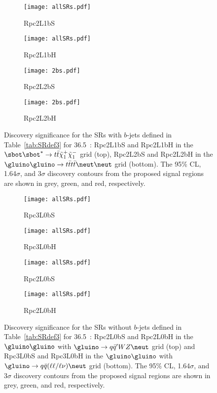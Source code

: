 \begin{figure}
\centering
\begin{subfigure}[t]{0.48\textwidth}
\caption{Rpc2L1bS}
\texttt{[image: allSRs.pdf]}
\end{subfigure}
\begin{subfigure}[t]{0.48\textwidth}
\caption{Rpc2L1bH}
\texttt{[image: allSRs.pdf]}
\end{subfigure}
\begin{subfigure}[t]{0.48\textwidth}
\caption{Rpc2L2bS}
\texttt{[image: 2bs.pdf]}
\end{subfigure}
\begin{subfigure}[t]{0.48\textwidth}
\caption{Rpc2L2bH}
\texttt{[image: 2bs.pdf]}
\end{subfigure}
\caption{Discovery significance for the SRs with $b$-jets defined in 
Table~\ref{tab:SRdef3} for 36.5~\ifb: Rpc2L1bS and  Rpc2L1bH in the $\sbot\sbot^*\to t\bar t\tilde\chi_1^+\tilde\chi_1^-$ grid (top), Rpc2L2bS and Rpc2L2bH in the $\gluino\gluino\to t\bar tt\bar t\neut\neut$ grid (bottom). The 95\% CL, 
1.64$\sigma$, and 3$\sigma$ discovery contours from the proposed signal 
regions are shown in grey, green, and red, respectively. 
}
\label{fig:SR_withB}
\end{figure}


\begin{figure}
\centering
\begin{subfigure}[t]{0.48\textwidth}
\caption{Rpc3L0bS}
\texttt{[image: allSRs.pdf]}
\end{subfigure}
\begin{subfigure}[t]{0.48\textwidth}
\caption{Rpc3L0bH}
\texttt{[image: allSRs.pdf]}
\end{subfigure}
\begin{subfigure}[t]{0.48\textwidth}
\caption{Rpc2L0bS}
\texttt{[image: allSRs.pdf]}
\end{subfigure}
\begin{subfigure}[t]{0.48\textwidth}
\caption{Rpc2L0bH}
\texttt{[image: allSRs.pdf]}
\end{subfigure}
\caption{Discovery significance for the SRs without $b$-jets defined in Table~\ref{tab:SRdef3} for 36.5~\ifb: Rpc2L0bS and Rpc2L0bH in the $\gluino\gluino$ with $\gluino\to q\bar{q}'WZ\neut$ grid (top) and Rpc3L0bS and Rpc3L0bH in the $\gluino\gluino$ with $\gluino\to q\bar{q}(\ell\ell/\ell\nu)\neut$ grid (bottom). The 95\% CL, 1.64$\sigma$, and 3$\sigma$ discovery contours from the proposed signal regions are shown in grey, green, and red, respectively.
}
\label{fig:SR_noB}
\end{figure}


